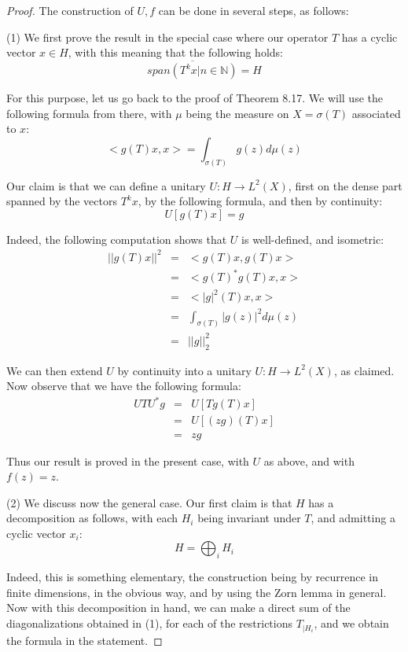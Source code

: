 \documentclass[12pt]{amsbook}
\begin{document}
\begin{proof}
The construction of $U,f$ can be done in several steps, as follows:

\medskip

(1) We first prove the result in the special case where our operator $T$ has a cyclic vector $x\in H$, with this meaning that the following holds:
$$\overline{span\left(T^kx\Big|n\in\mathbb N\right)}=H$$

For this purpose, let us go back to the proof of Theorem 8.17. We will use the following formula from there, with $\mu$ being the measure on $X=\sigma(T)$ associated to $x$:
$$<g(T)x,x>=\int_{\sigma(T)}g(z)d\mu(z)$$

Our claim is that we can define a unitary $U:H\to L^2(X)$, first on the dense part spanned by the vectors $T^kx$, by the following formula, and then by continuity:
$$U[g(T)x]=g$$

Indeed, the following computation shows that $U$ is well-defined, and isometric:
\begin{eqnarray*}
||g(T)x||^2
&=&<g(T)x,g(T)x>\\
&=&<g(T)^*g(T)x,x>\\
&=&<|g|^2(T)x,x>\\
&=&\int_{\sigma(T)}|g(z)|^2d\mu(z)\\
&=&||g||_2^2
\end{eqnarray*}

We can then extend $U$ by continuity into a unitary $U:H\to L^2(X)$, as claimed. Now observe that we have the following formula:
\begin{eqnarray*}
UTU^*g
&=&U[Tg(T)x]\\
&=&U[(zg)(T)x]\\
&=&zg
\end{eqnarray*} 

Thus our result is proved in the present case, with $U$ as above, and with $f(z)=z$.

\medskip

(2) We discuss now the general case. Our first claim is that $H$ has a decomposition as follows, with each $H_i$ being invariant under $T$, and admitting a cyclic vector $x_i$:
$$H=\bigoplus_iH_i$$

Indeed, this is something elementary, the construction being by recurrence in finite dimensions, in the obvious way, and by using the Zorn lemma in general. Now with this decomposition in hand, we can make a direct sum of the diagonalizations obtained in (1), for each of the restrictions $T_{|H_i}$, and we obtain the formula in the statement.
\end{proof}
\end{document}
